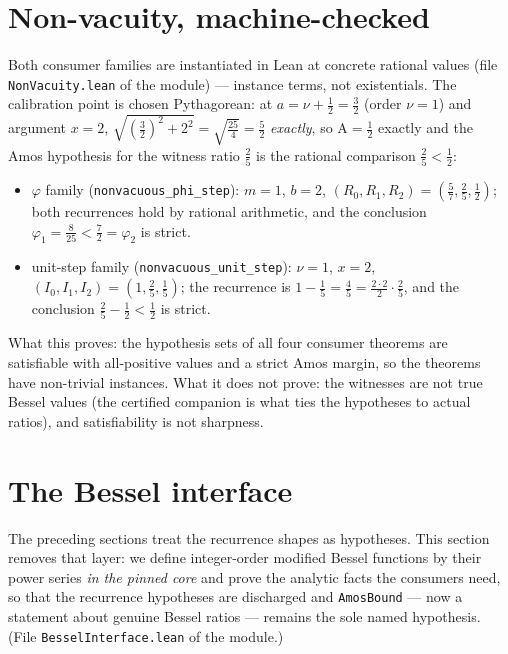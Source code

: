 \documentclass[11pt]{article}
\newcommand{\lean}[1]{\texttt{#1}}
\newcommand{\RHS}{\mathrm{A}}
\begin{document}
\section{Non-vacuity, machine-checked}\label{sec:nonvacuity}

Both consumer families are instantiated in Lean at concrete rational
values (file \lean{NonVacuity.lean} of the module) --- instance
terms, not existentials.  The calibration point is chosen Pythagorean:
at $a = \nu + \tfrac12 = \tfrac32$ (order $\nu = 1$) and argument
$x = 2$,
$\sqrt{(\tfrac32)^2 + 2^2} = \sqrt{\tfrac{25}{4}} = \tfrac52$
\emph{exactly}, so $\RHS = \tfrac12$ exactly and the Amos hypothesis
for the witness ratio $\tfrac25$ is the rational comparison
$\tfrac25 < \tfrac12$:
\begin{itemize}
\item $\varphi$ family (\lean{nonvacuous\_phi\_step}): $m=1$, $b=2$,
  $(R_0, R_1, R_2) = (\tfrac57, \tfrac25, \tfrac12)$; both
  recurrences hold by rational arithmetic, and the conclusion
  $\varphi_1 = \tfrac{8}{25} < \tfrac72 = \varphi_2$ is strict.
\item unit-step family (\lean{nonvacuous\_unit\_step}): $\nu=1$,
  $x=2$, $(I_0, I_1, I_2) = (1, \tfrac25, \tfrac15)$; the recurrence
  is $1 - \tfrac15 = \tfrac45 = \tfrac{2\cdot 2}{2}\cdot\tfrac25$,
  and the conclusion $\tfrac25 - \tfrac12 < \tfrac12$ is strict.
\end{itemize}
What this proves: the hypothesis sets of all four consumer theorems
are satisfiable with all-positive values and a strict Amos margin, so
the theorems have non-trivial instances.  What it does not prove:
the witnesses are not true Bessel values (the certified companion is
what ties the hypotheses to actual ratios), and satisfiability is not
sharpness.

\section{The Bessel interface}\label{sec:interface}

The preceding sections treat the recurrence shapes as hypotheses.
This section removes that layer: we define integer-order modified
Bessel functions by their power series \emph{in the pinned core} and
prove the analytic facts the consumers need, so that the recurrence
hypotheses are discharged and \lean{AmosBound} --- now a statement
about genuine Bessel ratios --- remains the sole named hypothesis.
(File \lean{BesselInterface.lean} of the module.)
\end{document}
